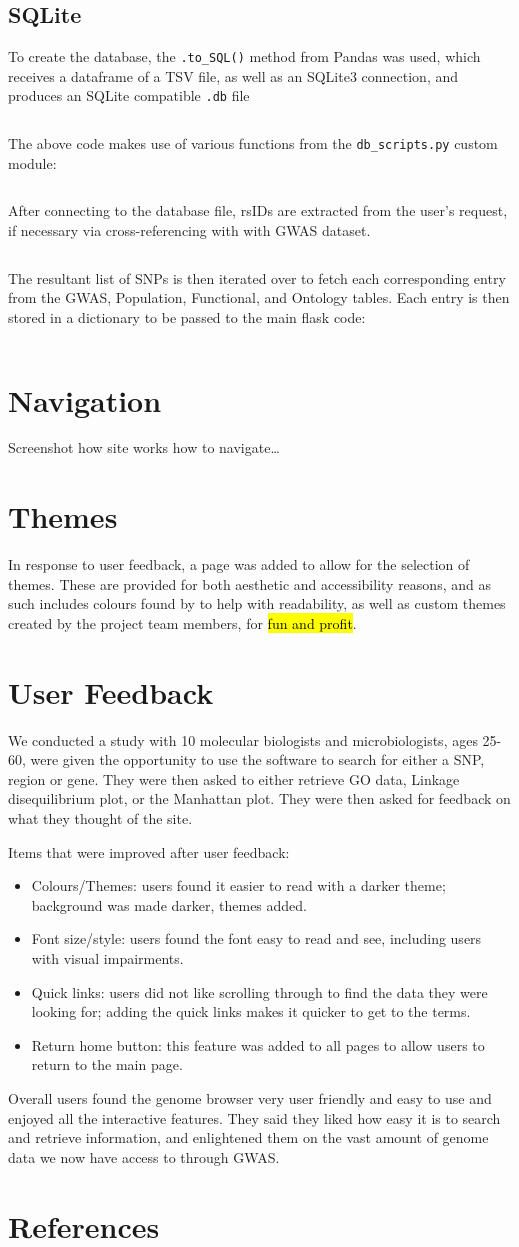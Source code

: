\documentclass[12pt,a4paper]{article}
\newcommand{\mintfile}[1]{
\begin{tcolorbox}[colback=gray!5!white,%
	grow to left by=20mm,
    grow to right by=20mm,
    sharp corners]{{    \small \inputminted[breaklines]{python}{#1}		}}
\end{tcolorbox}}
\newcommand{\sect}[1]{
\clearpage
\hypertarget{#1}{
\section{#1}\label{#1}}
}
\newcommand{\subsect}[1]{
\FloatBarrier %
\hypertarget{#1}{
\subsection{#1}\label{#1}}
}
\begin{document}
\mintfile{code_snippets/flask/snp.py}

\subsect{SQLite}

To create the database, the \texttt{.to\_SQL()} method from Pandas was used, which receives a dataframe of a TSV file,
as well as an SQLite3 connection, and produces an SQLite compatible \texttt{.db} file

\mintfile{code_snippets/SQL/create_db.py}
The above code makes use of various functions from the \texttt{db\_scripts.py} custom module:

\mintfile{code_snippets/SQL/pdDB.py}

After connecting to the database file, rsIDs are extracted from the user's request,
if necessary via cross-referencing with with GWAS dataset.

\mintfile{code_snippets/SQL/DBreq1.py}

The resultant list of SNPs is then iterated over to fetch each corresponding entry from the
GWAS, Population, Functional, and Ontology tables.
Each entry is then stored in a dictionary to be passed to the main flask code:

\FloatBarrier

\mintfile{code_snippets/SQL/DBreq2.py}
\FloatBarrier

\sect{Navigation}
Screenshot how site works how to navigate\ldots


\sect{Themes}

In response to user feedback, a page was added to allow for the selection of themes.
These are provided for both aesthetic and accessibility reasons,
and as such includes colours found by \textcite{AccessColours} to help with readability,
as well as custom themes created by the project team members, for \hl{fun and profit}.




\sect{User Feedback}
We conducted a study with 10 molecular biologists and microbiologists, ages 25-60, were given the opportunity to use the software to search for either a SNP, region or gene. They were then asked to either retrieve GO data, Linkage disequilibrium plot, or the Manhattan plot. They were then asked for feedback on what they thought of the site.

Items that were improved after user feedback:

\begin{itemize}
\item Colours/Themes: users found it easier to read with a darker theme; background was made darker, themes added.
\item Font size/style: users found the font easy to read and see, including users with visual impairments.
\item Quick links: users did not like scrolling through to find the data they were looking for; adding the quick links makes it quicker to get to the terms.
\item Return home button: this feature was added to all pages to allow users to return to the main page.
\end{itemize}

Overall users found the genome browser very user friendly and easy to use and enjoyed all the interactive features. They said they liked how easy it is to search and retrieve information, and enlightened them on the vast amount of genome data we now have access to through GWAS.

\sect{References}
\end{document}
